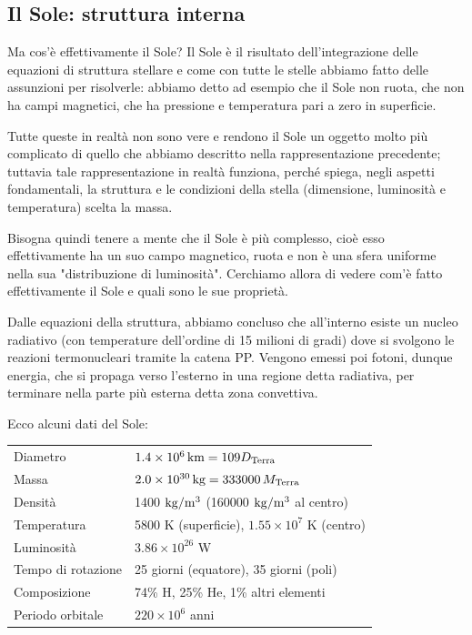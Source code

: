 \subsection{Il Sole: struttura interna}
Ma cos'è effettivamente il Sole? Il Sole è il risultato dell'integrazione delle equazioni di struttura stellare e come con tutte le stelle abbiamo fatto delle assunzioni per risolverle: abbiamo detto ad esempio che il Sole non ruota, che non ha campi magnetici, che ha pressione e temperatura pari a zero in superficie.

Tutte queste in realtà non sono vere e rendono il Sole un oggetto molto più complicato di quello che abbiamo descritto nella rappresentazione precedente; tuttavia tale rappresentazione in realtà funziona, perché spiega, negli aspetti fondamentali, la struttura e le condizioni della stella (dimensione, luminosità e temperatura) scelta la massa.

Bisogna quindi tenere a mente che il Sole è più complesso, cioè esso effettivamente ha un suo campo magnetico, ruota e non è una sfera uniforme nella sua "distribuzione di luminosità". Cerchiamo allora di vedere com'è fatto effettivamente il Sole e quali sono le sue proprietà.

Dalle equazioni della struttura, abbiamo concluso che all'interno esiste un nucleo radiativo (con temperature dell'ordine di 15 milioni di gradi) dove si svolgono le reazioni termonucleari tramite la catena PP. Vengono emessi poi fotoni, dunque energia, che si propaga verso l'esterno in una regione detta radiativa, per terminare nella parte più esterna detta zona convettiva.

Ecco alcuni dati del Sole:

\begin{center}
    \begin{tabular}{ll}
        Diametro & $1.4 \times 10^6 \, \text{km} = 109 D_{\rm Terra}$\\
        Massa & $2.0 \times 10^{30} \, \text{kg}=333000 \, M_{\rm Terra}$\\
        Densità & 1400 $\rm kg/m^3$ (160000 $\rm kg/m^3$ al centro)\\
        Temperatura & 5800 K (superficie), $1.55 \times 10^{7}$ K (centro)\\
        Luminosità & $3.86 \times 10^{26}$ W\\
        Tempo di rotazione & 25 giorni (equatore), 35 giorni (poli)\\
        Composizione & 74\% H, 25\% He, 1\% altri elementi\\
        Periodo orbitale & $220 \times 10^6$ anni\\
    \end{tabular}
\end{center}

